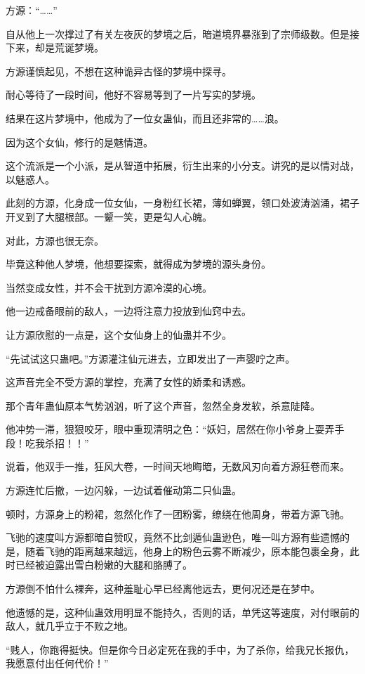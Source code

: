 \begin{this_body}
方源：“……”

自从他上一次撑过了有关左夜灰的梦境之后，暗道境界暴涨到了宗师级数。但是接下来，却是荒诞梦境。

方源谨慎起见，不想在这种诡异古怪的梦境中探寻。

耐心等待了一段时间，他好不容易等到了一片写实的梦境。

结果在这片梦境中，他成为了一位女蛊仙，而且还非常的……浪。

因为这个女仙，修行的是魅情道。

这个流派是一个小派，是从智道中拓展，衍生出来的小分支。讲究的是以情对战，以魅惑人。

此刻的方源，化身成一位女仙，一身粉红长裙，薄如蝉翼，领口处波涛汹涌，裙子开叉到了大腿根部。一颦一笑，更是勾人心魄。

对此，方源也很无奈。

毕竟这种他人梦境，他想要探索，就得成为梦境的源头身份。

当然变成女性，并不会干扰到方源冷漠的心境。

他一边戒备眼前的敌人，一边将注意力投放到仙窍中去。

让方源欣慰的一点是，这个女仙身上的仙蛊并不少。

“先试试这只蛊吧。”方源灌注仙元进去，立即发出了一声婴咛之声。

这声音完全不受方源的掌控，充满了女性的娇柔和诱惑。

那个青年蛊仙原本气势汹汹，听了这个声音，忽然全身发软，杀意陡降。

他冲势一滞，狠狠咬牙，眼中重现清明之色：“妖妇，居然在你小爷身上耍弄手段！吃我杀招！！”

说着，他双手一推，狂风大卷，一时间天地晦暗，无数风刃向着方源狂卷而来。

方源连忙后撤，一边闪躲，一边试着催动第二只仙蛊。

顿时，方源身上的粉裙，忽然化作了一团粉雾，缭绕在他周身，带着方源飞驰。

飞驰的速度叫方源都暗自赞叹，竟然不比剑遁仙蛊逊色，唯一叫方源有些遗憾的是，随着飞驰的距离越来越远，他身上的粉色云雾不断减少，原本能包裹全身，此时已经被迫露出雪白粉嫩的大腿和胳膊了。

方源倒不怕什么裸奔，这种羞耻心早已经离他远去，更何况还是在梦中。

他遗憾的是，这种仙蛊效用明显不能持久，否则的话，单凭这等速度，对付眼前的敌人，就几乎立于不败之地。

“贱人，你跑得挺快。但是你今日必定死在我的手中，为了杀你，给我兄长报仇，我愿意付出任何代价！”


\end{this_body}
